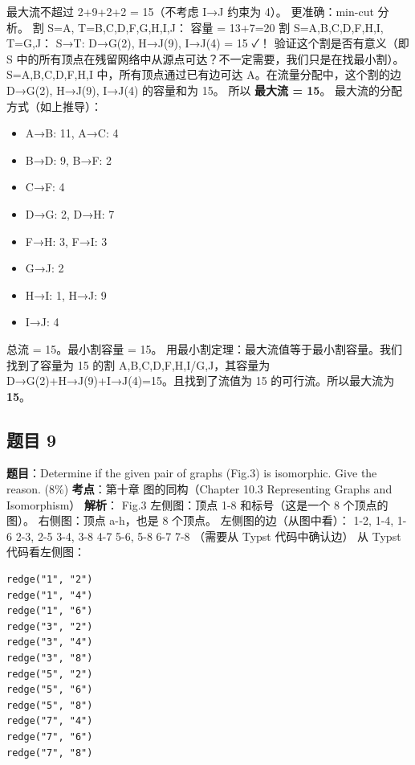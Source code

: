 \documentclass[10pt,a4paper,openany]{ctexbook}
\theoremstyle{definition}
\theoremstyle{remark}
\begin{document}
最大流不超过 2+9+2+2 = 15（不考虑 I→J 约束为 4）。
更准确：min-cut 分析。
割 S={A}, T={B,C,D,F,G,H,I,J}：
容量 = 13+7=20
割 S={A,B,C,D,F,H,I}, T={G,J}：
S→T: D→G(2), H→J(9), I→J(4) = 15 ✓！
验证这个割是否有意义（即 S 中的所有顶点在残留网络中从源点可达？不一定需要，我们只是在找最小割）。
S={A,B,C,D,F,H,I} 中，所有顶点通过已有边可达 A。在流量分配中，这个割的边 D→G(2), H→J(9), I→J(4) 的容量和为 15。
所以 \textbf{最大流 = 15}。
最大流的分配方式（如上推导）：
\begin{itemize}
\item A→B: 11, A→C: 4
\item B→D: 9, B→F: 2
\item C→F: 4
\item D→G: 2, D→H: 7
\item F→H: 3, F→I: 3
\item G→J: 2
\item H→I: 1, H→J: 9
\item I→J: 4

\end{itemize}

总流 = 15。最小割容量 = 15。
用最小割定理：最大流值等于最小割容量。我们找到了容量为 15 的割 {A,B,C,D,F,H,I}/{G,J}，其容量为 D→G(2)+H→J(9)+I→J(4)=15。且找到了流值为 15 的可行流。所以最大流为 \textbf{15}。
\vspace{-2pt}

\subsection{题目 9}

\textbf{题目}：Determine if the given pair of graphs (Fig.3) is isomorphic. Give the reason. (8\%)
\textbf{考点}：第十章 图的同构（Chapter 10.3 Representing Graphs and Isomorphism）
\textbf{解析}：
Fig.3 左侧图：顶点 1-8 和标号（这是一个 8 个顶点的图）。
右侧图：顶点 a-h，也是 8 个顶点。
左侧图的边（从图中看）：
1-2, 1-4, 1-6
2-3, 2-5
3-4, 3-8
4-7
5-6, 5-8
6-7
7-8
（需要从 Typst 代码中确认边）
从 Typst 代码看左侧图：
{\footnotesize\begin{verbatim}
redge("1", "2")
redge("1", "4")
redge("1", "6")
redge("3", "2")
redge("3", "4")
redge("3", "8")
redge("5", "2")
redge("5", "6")
redge("5", "8")
redge("7", "4")
redge("7", "6")
redge("7", "8")
\end{verbatim}}
\end{document}
